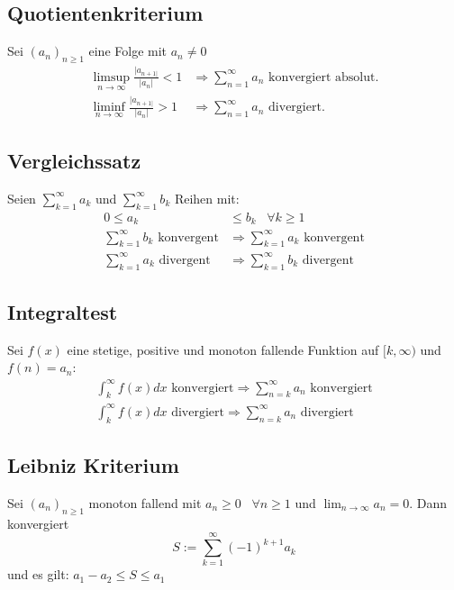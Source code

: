 \documentclass[8pt]{article}
\begin{document}
\begin{multicols*}{3}
\subsection{Quotientenkriterium}

Sei $(a_n)_{n \geq 1}$ eine Folge mit $a_n \neq 0$
\begin{align*}
  \limsup_{n \rightarrow \infty} \frac{|a_{n+1|}}{|a_n|} < 1 &\Rightarrow \sum_{n = 1}^\infty a_n \text{ konvergiert absolut.}\\
  \liminf_{n \rightarrow \infty} \frac{|a_{n+1|}}{|a_n|} > 1 &\Rightarrow \sum_{n = 1}^\infty a_n \text{ divergiert.}
\end{align*}

\subsection{Vergleichssatz}

Seien $\sum_{k = 1}^\infty a_k$ und $\sum_{k = 1}^\infty b_k$ Reihen mit:
\begin{align*}
  0 \leq a_k &\leq b_k \; \; \; \forall k \geq 1\\
  \sum_{k = 1}^\infty b_k \text{ konvergent} &\Rightarrow \sum_{k = 1}^\infty a_k \text{ konvergent}\\
  \sum_{k = 1}^\infty a_k \text{ divergent} &\Rightarrow \sum_{k = 1}^\infty b_k \text{ divergent}
\end{align*}
\subsection{Integraltest}

Sei $f(x)$ eine stetige, positive und monoton fallende
Funktion auf $[k, \infty)$ und $f(n) = a_n$:
\begin{align*}
\int_{k}^{\infty} f(x) dx \text{ konvergiert} \Rightarrow \sum_{n = k}^{\infty} a_n \text{ konvergiert}\\
\int_{k}^{\infty} f(x) dx \text{ divergiert}  \Rightarrow \sum_{n = k}^{\infty} a_n \text{ divergiert}
\end{align*}

\subsection{Leibniz Kriterium}

Sei $(a_n)_{n \geq 1}$ monoton fallend mit $a_n \geq 0 \; \; \; \forall n \geq 1$ und
$\lim_{n \rightarrow \infty} a_n = 0$. Dann konvergiert
$$
  S := \sum_{k = 1}^\infty (-1)^{k + 1} a_k
$$
und es gilt: $a_1 - a_2 \leq S \leq a_1$


\end{multicols*}
\end{document}
